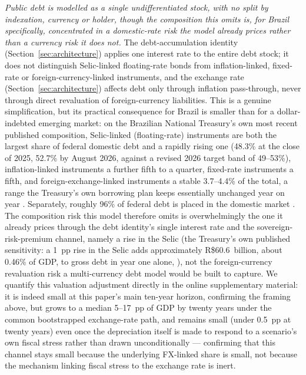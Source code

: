 \documentclass[11pt,a4paper]{article}
\begin{document}
\emph{Public debt is modelled as a single undifferentiated stock, with no split by indexation, currency or holder, though the composition this omits is, for Brazil specifically, concentrated in a domestic-rate risk the model already prices rather than a currency risk it does not.} The debt-accumulation identity (Section~\ref{sec:architecture}) applies one interest rate to the entire debt stock; it does not distinguish Selic-linked floating-rate bonds from inflation-linked, fixed-rate or foreign-currency-linked instruments, and the exchange rate (Section~\ref{sec:architecture}) affects debt only through inflation pass-through, never through direct revaluation of foreign-currency liabilities. This is a genuine simplification, but its practical consequence for Brazil is smaller than for a dollar-indebted emerging market: on the Brazilian National Treasury's own most recent published composition, Selic-linked (floating-rate) instruments are both the largest share of federal domestic debt and a rapidly rising one (48.3\% at the close of 2025, 52.7\% by August 2026, against a revised 2026 target band of 49--53\%), inflation-linked instruments a further fifth to a quarter, fixed-rate instruments a fifth, and foreign-exchange-linked instruments a stable 3.7--4.4\% of the total, a range the Treasury's own borrowing plan keeps essentially unchanged year on year \citep{tesourormd2026}. Separately, roughly 96\% of federal debt is placed in the domestic market \citep{tesourormd2026}. The composition risk this model therefore omits is overwhelmingly the one it already prices through the debt identity's single interest rate and the sovereign-risk-premium channel, namely a rise in the Selic (the Treasury's own published sensitivity: a 1~pp rise in the Selic adds approximately R\$60.6~billion, about 0.46\% of GDP, to gross debt in year one alone, \citealp{tesourormd2026}), not the foreign-currency revaluation risk a multi-currency debt model would be built to capture. We quantify this valuation adjustment directly in the online supplementary material: it is indeed small at this paper's main ten-year horizon, confirming the framing above, but grows to a median 5--17~pp of GDP by twenty years under the common bootstrapped exchange-rate path, and remains small (under 0.5~pp at twenty years) even once the depreciation itself is made to respond to a scenario's own fiscal stress rather than drawn unconditionally --- confirming that this channel stays small because the underlying FX-linked share is small, not because the mechanism linking fiscal stress to the exchange rate is inert.
\end{document}
